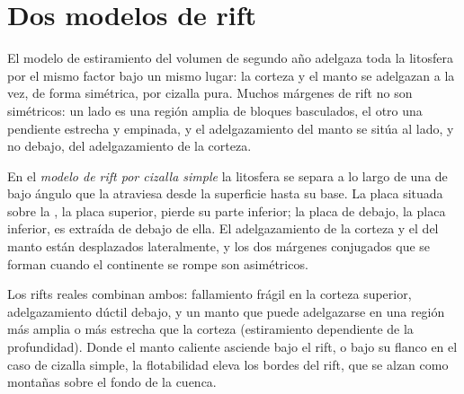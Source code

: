 \section{Dos modelos de rift}\label{sec:b3:extension-strike-slip:models}

El modelo de estiramiento del volumen de segundo año adelgaza toda la litosfera por el
mismo factor bajo un mismo lugar: la corteza y el manto se adelgazan a la vez,
de forma simétrica, por cizalla pura. Muchos márgenes de rift no son simétricos: un lado
es una región amplia de bloques basculados, el otro una pendiente estrecha y empinada, y el
adelgazamiento del manto se sitúa al lado, y no debajo, del adelgazamiento de la corteza.

\begin{definition}\label{def:b3:extension-strike-slip:rift-models}
En el \emph{modelo de rift por cizalla simple} la
litosfera se separa a lo largo de una  de bajo ángulo que la atraviesa
desde la superficie hasta su base. La placa situada sobre la , la
placa superior, pierde su parte inferior; la placa de debajo, la placa inferior, es extraída
de debajo de ella. El adelgazamiento de la corteza y el del manto están
desplazados lateralmente, y los dos márgenes conjugados que se forman cuando el continente
se rompe son asimétricos.
\end{definition}

Los rifts reales combinan ambos: fallamiento frágil en la corteza superior, adelgazamiento dúctil
debajo, y un manto que puede adelgazarse en una región más amplia o más estrecha que la
corteza (estiramiento dependiente de la profundidad). Donde el manto caliente asciende bajo el
rift, o bajo su flanco en el caso de cizalla simple, la flotabilidad eleva los
bordes del rift, que se alzan como montañas sobre el fondo de la cuenca.


